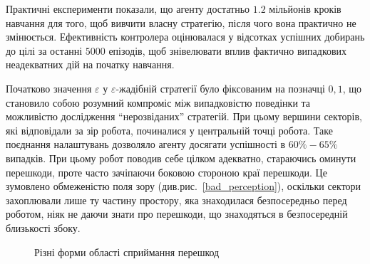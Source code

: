 \documentclass[a4paper,10pt,fleqn]{article}
\begin{document}
Практичні експерименти показали, що агенту достатньо $1.2$ мільйонів кроків навчання для того, щоб вивчити власну стратегію, після чого вона практично не змінюється. Ефективність контролера оцінювалася у відсотках успішних добирань до цілі за останні $5000$ епізодів, щоб знівелювати вплив фактично випадкових неадекватних дій на початку навчання.

Початково значення $\varepsilon$ у $\varepsilon$-жадібній стратегії було фіксованим на позначці $0,1$, що становило собою розумний компроміс між випадковістю поведінки та можливістю дослідження ``нерозвіданих'' стратегій. При цьому вершини секторів, які відповідали за зір робота, починалися у центральній точці робота. Таке поєднання налаштувань дозволяло агенту досягати успішності в $60\%-65\%$ випадків. При цьому робот поводив себе цілком адекватно, стараючись оминути перешкоди, проте часто зачіпаючи боковою стороною краї перешкоди. Це зумовлено обмеженістю поля зору (див.рис.~\ref{bad_perception}), оскільки сектори захоплювали лише ту частину простору, яка знаходилася безпосередньо перед роботом, ніяк не даючи знати про перешкоди, що знаходяться в безпосередній близькості збоку.

\begin{figure}
	\centering
	\;
	\caption{Різні форми області сприймання перешкод}
	\label{bad_and_good_perception}
\end{figure}
\end{document}
